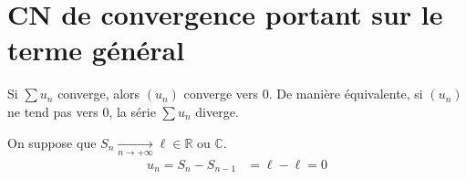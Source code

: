 \documentclass[../main.tex]{subfiles}
\begin{document}
\section{CN de convergence portant sur le terme général}
\begin{tcolorbox}[title=Théorème 27.12, title filled=false, colframe=orange, colback=orange!10!white]
    Si $\sum u_n$ converge, alors $(u_n)$ converge vers $0$. De manière équivalente, si $(u_n)$ ne tend pas vers $0$, la série $\sum u_n$ diverge.
\end{tcolorbox}

\noindent On suppose que $S_n \underset{n \to +\infty}{\longrightarrow} \ell \in \mathbb{R} \text{ ou } \mathbb{C}$. \\
\begin{align*}
    u_n = S_n - S_{n-1} &= \ell - \ell = 0
\end{align*}
\end{document}
